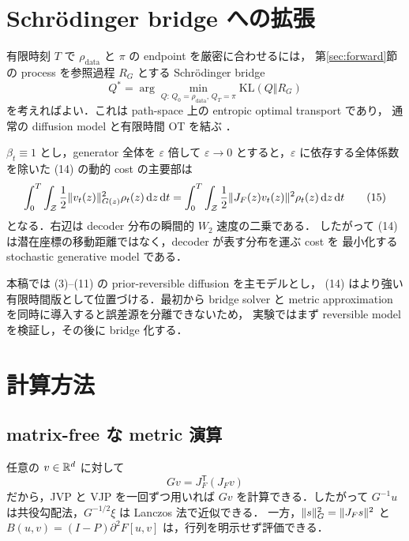 \documentclass[uplatex,dvipdfmx,11pt,a4paper]{jsarticle}
\begin{document}
\section{Schr\"odinger bridge への拡張}
\label{sec:bridge}

有限時刻 $T$ で $\rho_{\mathrm{data}}$ と $\pi$ の endpoint を厳密に合わせるには，
第\ref{sec:forward}節の process を参照過程 $R_G$ とする
Schr\"odinger bridge
\[
  Q^*
  =\arg\min_{Q:\,Q_0=\rho_{\mathrm{data}},\,Q_T=\pi}
    \mathrm{KL}(Q\Vert R_G)
  \tag{14}
\]
を考えればよい．これは path-space 上の entropic optimal transport であり，
通常の diffusion model と有限時間 OT を結ぶ \cite{debortoli2021,tong2024}．

$\beta_t\equiv1$ とし，generator 全体を $\varepsilon$ 倍して
$\varepsilon\to0$ とすると，$\varepsilon$ に依存する全体係数を除いた
(14) の動的 cost の主要部は
\[
  \int_0^T\int_{\mathcal{Z}}
    \frac12\lVert v_t(z) \rVert_{G(z)}^2\rho_t(z)\,\mathrm{d} z\,\mathrm{d} t
  =\int_0^T\int_{\mathcal{Z}}
    \frac12\lVert J_F(z)v_t(z) \rVert^2\rho_t(z)\,\mathrm{d} z\,\mathrm{d} t
  \tag{15}
\]
となる．右辺は decoder 分布の瞬間的 $W_2$ 速度の二乗である．
したがって (14) は潜在座標の移動距離ではなく，decoder が表す分布を運ぶ cost を
最小化する stochastic generative model である．

本稿では (3)--(11) の prior-reversible diffusion を主モデルとし，
(14) はより強い有限時間版として位置づける．最初から bridge solver と
metric approximation を同時に導入すると誤差源を分離できないため，
実験ではまず reversible model を検証し，その後に bridge 化する．

\section{計算方法}
\label{sec:computation}

\subsection{matrix-free な metric 演算}

任意の $v\in\mathbb{R}^d$ に対して
\[
  Gv=J_F^{\mathsf T}(J_Fv)
\]
だから，JVP と VJP を一回ずつ用いれば $Gv$ を計算できる．したがって
$G^{-1}u$ は共役勾配法，$G^{-1/2}\xi$ は Lanczos 法で近似できる．
一方，$\lVert s \rVert_G^2=\lVert J_Fs \rVert^2$ と
$B(u,v)=(I-P)\partial^2F[u,v]$ は，行列を明示せず評価できる．
\end{document}
